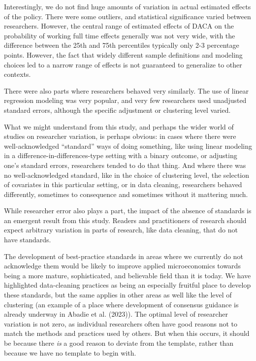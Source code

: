 \documentclass[
  letterpaper,
  DIV=11,
  numbers=noendperiod]{scrartcl}
\begin{document}
Interestingly, we do not find huge amounts of variation in actual
estimated effects of the policy. There were some outliers, and
statistical significance varied between researchers. However, the
central range of estimated effects of DACA on the probability of working
full time effects generally was not very wide, with the difference
between the 25th and 75th percentiles typically only 2-3 percentage
points. However, the fact that widely different sample definitions and
modeling choices led to a narrow range of effects is not guaranteed to
generalize to other contexts.

There were also parts where researchers behaved very similarly. The use
of linear regression modeling was very popular, and very few researchers
used unadjusted standard errors, although the specific adjustment or
clustering level varied.

What we might understand from this study, and perhaps the wider world of
studies on researcher variation, is perhaps obvious: in cases where
there were well-acknowledged ``standard'' ways of doing something, like
using linear modeling in a difference-in-differences-type setting with a
binary outcome, or adjusting one's standard errors, researchers tended
to do that thing. And where there was no well-acknowledged standard,
like in the choice of clustering level, the selection of covariates in
this particular setting, or in data cleaning, researchers behaved
differently, sometimes to consequence and sometimes without it mattering
much.

While researcher error also plays a part, the impact of the absence of
standards is an emergent result from this study. Readers and
practitioners of research should expect arbitrary variation in parts of
research, like data cleaning, that do not have standards.

The development of best-practice standards in areas where we currently
do not acknowledge them would be likely to improve applied
microeconomics towards being a more mature, sophisticated, and
believable field than it is today. We have highlighted data-cleaning
practices as being an especially fruitful place to develop these
standards, but the same applies in other areas as well like the level of
clustering (an example of a place where development of consensus
guidance is already underway in Abadie et al. (2023)). The optimal level
of researcher variation is not zero, as individual researchers often
have good reasons not to match the methods and practices used by others.
But when this occurs, it should be because there \emph{is} a good reason
to deviate from the template, rather than because we have no template to
begin with.
\end{document}
